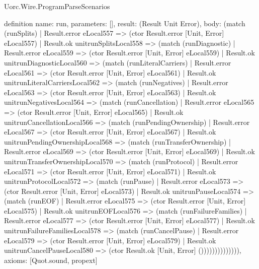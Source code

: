 \begin{lexlean}{Uorc.Wire.ProgramParseScenarios}
\begin{semanticmodule}
definition{
  name: run,
  parameters: [],
  result: (Result Unit Error),
  body: (match (runSplits)
    | Result.error eLocal557 => (ctor Result.error [Unit, Error] eLocal557)
    | Result.ok unitrunSplitsLocal558 => (match (runDiagnostic)
      | Result.error eLocal559 => (ctor Result.error [Unit, Error] eLocal559)
      | Result.ok unitrunDiagnosticLocal560 => (match (runLiteralCarriers)
        | Result.error eLocal561 => (ctor Result.error [Unit, Error] eLocal561)
        | Result.ok unitrunLiteralCarriersLocal562 => (match (runNegatives)
          | Result.error eLocal563 => (ctor Result.error [Unit, Error] eLocal563)
          | Result.ok unitrunNegativesLocal564 => (match (runCancellation)
            | Result.error eLocal565 => (ctor Result.error [Unit, Error] eLocal565)
            | Result.ok unitrunCancellationLocal566 => (match (runPendingOwnership)
              | Result.error eLocal567 => (ctor Result.error [Unit, Error] eLocal567)
              | Result.ok unitrunPendingOwnershipLocal568 => (match (runTransferOwnership)
                | Result.error eLocal569 => (ctor Result.error [Unit, Error] eLocal569)
                | Result.ok unitrunTransferOwnershipLocal570 => (match (runProtocol)
                  | Result.error eLocal571 => (ctor Result.error [Unit, Error] eLocal571)
                  | Result.ok unitrunProtocolLocal572 => (match (runPause)
                    | Result.error eLocal573 => (ctor Result.error [Unit, Error] eLocal573)
                    | Result.ok unitrunPauseLocal574 => (match (runEOF)
                      | Result.error eLocal575 => (ctor Result.error [Unit, Error] eLocal575)
                      | Result.ok unitrunEOFLocal576 => (match (runFailureFamilies)
                        | Result.error eLocal577 => (ctor Result.error [Unit, Error] eLocal577)
                        | Result.ok unitrunFailureFamiliesLocal578 => (match (runCancelPause)
                          | Result.error eLocal579 => (ctor Result.error [Unit, Error] eLocal579)
                          | Result.ok unitrunCancelPauseLocal580 => (ctor Result.ok [Unit, Error] ()))))))))))))),
  axioms: [Quot.sound, propext]
}
\end{semanticmodule}
\end{lexlean}
